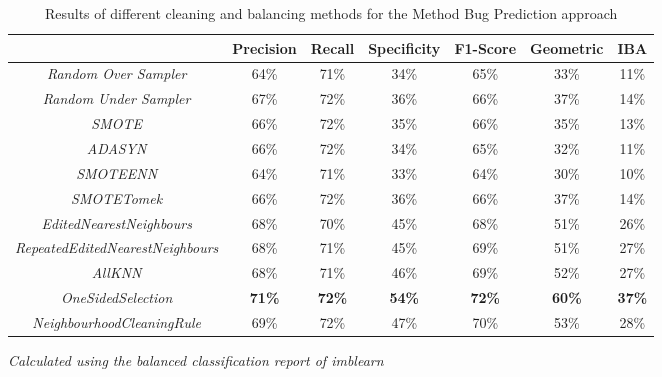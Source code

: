 \begin{table}[H]
	\caption{Results of different cleaning and balancing methods for the Method Bug Prediction approach}
	\label{result:bugPrediction}
	\centering
	\begin{tabular}{@{}ccccccc@{}}
		\toprule
		& \textbf{Precision} & \textbf{Recall} & \textbf{Specificity} & \textbf{F1-Score} & \textbf{Geometric} & \textbf{IBA}  \\ \midrule
		\textit{Random Over Sampler}             & 64\%               & 71\%            & 34\%                 & 65\%              & 33\%               & 11\%          \\
		\textit{Random Under Sampler}            & 67\%               & 72\%            & 36\%                 & 66\%              & 37\%               & 14\%          \\
		\textit{SMOTE}                           & 66\%               & 72\%            & 35\%                 & 66\%              & 35\%               & 13\%          \\
		\textit{ADASYN}                          & 66\%               & 72\%            & 34\%                 & 65\%              & 32\%               & 11\%          \\
		\textit{SMOTEENN}                        & 64\%               & 71\%            & 33\%                 & 64\%              & 30\%               & 10\%          \\
		\textit{SMOTETomek}                      & 66\%               & 72\%            & 36\%                 & 66\%              & 37\%               & 14\%          \\
		\textit{EditedNearestNeighbours}         & 68\%               & 70\%            & 45\%                 & 68\%              & 51\%               & 26\%          \\
		\textit{RepeatedEditedNearestNeighbours} & 68\%               & 71\%            & 45\%                 & 69\%              & 51\%               & 27\%          \\
		\textit{AllKNN}                          & 68\%               & 71\%            & 46\%                 & 69\%              & 52\%               & 27\%          \\
		\textit{OneSidedSelection}               & \textbf{71\%}      & \textbf{72\%}   & \textbf{54\%}        & \textbf{72\%}     & \textbf{60\%}      & \textbf{37\%} \\
		\textit{NeighbourhoodCleaningRule}       & 69\%               & 72\%            & 47\%                 & 70\%              & 53\%               & 28\%          \\ \bottomrule
	\end{tabular}
	\textit{Calculated using the balanced classification report of \textit{imblearn} \cite{imblearn}}
\end{table}

